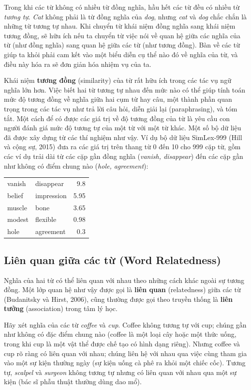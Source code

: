 Trong khi các từ không có nhiều từ đồng nghĩa, hầu hết các từ đều có nhiều từ \emph{tương tự}. \emph{Cat} không phải là từ đồng nghĩa của \emph{dog}, nhưng \emph{cat} và \emph{dog} chắc chắn là những từ tương tự nhau. Khi chuyển từ khái niệm đồng nghĩa sang khái niệm tương đồng, sẽ hữu ích nếu ta chuyển từ việc nói về quan hệ giữa các nghĩa của từ (như đồng nghĩa) sang quan hệ giữa các từ (như tương đồng). Bàn về các từ giúp ta khỏi phải cam kết vào một biểu diễn cụ thể nào đó về nghĩa của từ, và điều này hóa ra sẽ đơn giản hóa nhiệm vụ của ta.

Khái niệm \textbf{tương đồng} (similarity) của từ rất hữu ích trong các tác vụ ngữ nghĩa lớn hơn. Việc biết hai từ tương tự nhau đến mức nào có thể giúp tính toán mức độ tương đồng về nghĩa giữa hai cụm từ hay câu, một thành phần quan trọng trong các tác vụ như trả lời câu hỏi, diễn giải lại (paraphrasing), và tóm tắt. Một cách để có được các giá trị về độ tương đồng của từ là yêu cầu con người đánh giá mức độ tương tự của một từ với một từ khác. Một số bộ dữ liệu đã được xây dựng từ các thí nghiệm như vậy. Ví dụ bộ dữ liệu SimLex-999 (Hill và cộng sự, 2015) đưa ra các giá trị trên thang từ 0 đến 10 cho 999 cặp từ, gồm các ví dụ trải dài từ các cặp gần đồng nghĩa (\emph{vanish, disappear}) đến các cặp gần như không có điểm chung nào (\emph{hole, agreement}):

\begin{center}
\begin{tabular}{ll r}
vanish & disappear & 9.8 \\
belief & impression & 5.95 \\
muscle & bone & 3.65 \\
modest & flexible & 0.98 \\
hole & agreement & 0.3 \\
\end{tabular}
\end{center}

\subsection*{Liên quan giữa các từ (Word Relatedness)}

Nghĩa của hai từ có thể liên quan với nhau theo những cách khác ngoài sự tương đồng. Một lớp quan hệ như vậy được gọi là \textbf{liên quan} (relatedness) giữa các từ (Budanitsky và Hirst, 2006), cũng thường được gọi theo truyền thống là \textbf{liên tưởng} (association) trong tâm lý học.

Hãy xét nghĩa của các từ \emph{coffee} và \emph{cup}. Coffee không tương tự với cup; chúng gần như không có đặc điểm chung nào (coffee là một loại cây hoặc một thức uống, trong khi cup là một vật thể được chế tạo có hình dạng riêng). Nhưng coffee và cup rõ ràng có liên quan với nhau; chúng liên hệ với nhau qua việc cùng tham gia vào một sự kiện thường ngày (sự kiện uống cà phê ra khỏi một chiếc cốc). Tương tự, \emph{scalpel} và \emph{surgeon} không tương tự nhưng có liên quan với nhau qua một sự kiện (bác sĩ phẫu thuật thường dùng dao mổ).

